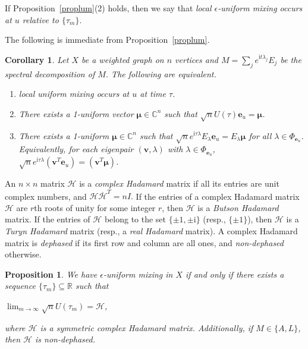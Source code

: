 \documentclass[11pt]{article}
\newtheorem{corollary}{Corollary}
\newtheorem{proposition}{Proposition}
\newcommand{\be}{\mathbf e}
\newcommand{\bv}{\mathbf v}
\newcommand{\bmu}{{\boldsymbol{\mu}}}
\def\ii{\mathrm{i}}
\newcommand{\supp}{{\Phi}}
\def\C{\mathbb{C}}
\def\R{\mathbb{R}}
\begin{document}
If Proposition~\ref{proplum}(2) holds, then we say that \textit{local $\epsilon$-uniform mixing occurs at $u$ relative to $\{\tau_m\}$}. 

The following is immediate from Proposition~\ref{proplum}.

\begin{corollary}
\label{charlum}
Let $X$ be a weighted graph on $n$ vertices and $M=\sum_{j}e^{\ii t\lambda_j}E_j$ be the spectral decomposition of $M$. The following are equivalent.
\begin{enumerate}
\item local uniform mixing occurs at $u$ at time $\tau$.
\item There exists a 1-uniform vector $\bmu\in\C^n$ such that $\sqrt{n}U(\tau)\be_u=\bmu$.
\item There exists a 1-uniform $\bmu\in\C^n$ such that $\sqrt{n}e^{\ii \tau\lambda}E_\lambda\be_u=E_\lambda\bmu$ for all $\lambda\in\supp_{\be_u}$.
Equivalently, for each eigenpair $(\bv,\lambda)$ with $\lambda\in\supp_{\be_u}$, $\sqrt{n}e^{\ii\tau\lambda}(\bv^T\be_u)=(\bv^T\bmu)$.
\end{enumerate}
\end{corollary}

An $n\times n$ matrix $\mathcal{H}$ is a \textit{complex Hadamard} matrix if all its entries are unit complex numbers, and 
$
\mathcal{H}\overline{\mathcal{H}}^T=nI.$ If the entries of a complex Hadamard matrix $\mathcal{H}$ are $r$th roots of unity for some integer $r$, then $\mathcal{H}$ is a \textit{Butson Hadamard} matrix. If the entries of $\mathcal{H}$ belong to the set $\{\pm 1,\pm\ii\}$ (resp., $\{\pm 1\}$), then $\mathcal{H}$ is a \textit{Turyn Hadamard} matrix (resp., a \textit{real Hadamard} matrix). A complex Hadamard matrix is \textit{dephased} if its first row and column are all ones, and \textit{non-dephased} otherwise. 

\begin{proposition}
\label{Lem:compHad}
We have $\epsilon$-uniform mixing in $X$ if and only if there exists a sequence $\{\tau_m\}\subseteq \R$ such that
\begin{center}
$\displaystyle\lim_{m\rightarrow\infty}\sqrt{n}U(\tau_m)=\mathcal{H}$,
\end{center}
where $\mathcal{H}$ is a symmetric complex Hadamard matrix. Additionally, if $M\in\{A,L\}$, then $\mathcal{H}$ is non-dephased.
\end{proposition}
\end{document}
